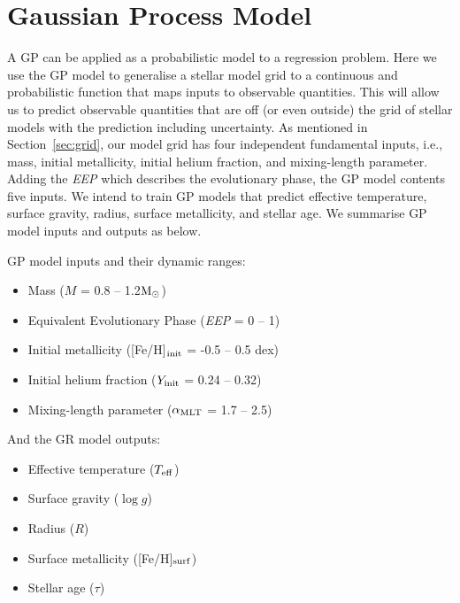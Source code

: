 \section{Gaussian Process Model}\label{sec:gpmodel}
A GP can be applied as a probabilistic model to a regression problem.  Here we use the GP model to generalise a stellar model grid to a continuous and probabilistic function that maps inputs to observable quantities.   This will allow us to predict observable quantities that are off (or even outside) the grid of stellar models with the prediction including uncertainty. 
%
As mentioned in Section~\ref{sec:grid}, our model grid has four independent fundamental inputs, i.e., mass, initial metallicity, initial helium fraction, and mixing-length parameter. Adding the {\it EEP} which describes the evolutionary phase, the GP model contents five inputs.  We intend to train GP models that predict effective temperature, surface gravity, radius, surface metallicity, and stellar age. We summarise GP model inputs and outputs as below.

GP model inputs and their dynamic ranges:
\begin{itemize}
\item[] Mass ($M$ = 0.8 -- 1.2$\rm M_{\odot}$)
\item[] Equivalent Evolutionary Phase ({\it EEP} = 0 -- 1)
\item[] Initial metallicity ([Fe/H]$_{\rm init}$ =  -0.5 -- 0.5 dex)
\item[] Initial helium fraction ($Y_{\rm init}$ = 0.24 -- 0.32)
\item[] Mixing-length parameter ($\alpha_{\rm MLT}$ = 1.7 -- 2.5)
\end{itemize}

And the GR model outputs: 
\begin{itemize}
\item[] Effective temperature ($T_{\rm eff}$) 
\item[] Surface gravity ($\log g$)
\item[] Radius ($R$)
\item[] Surface metallicity ([Fe/H]$_{\rm surf}$)
\item[] Stellar age ($\tau$)
\end{itemize}

